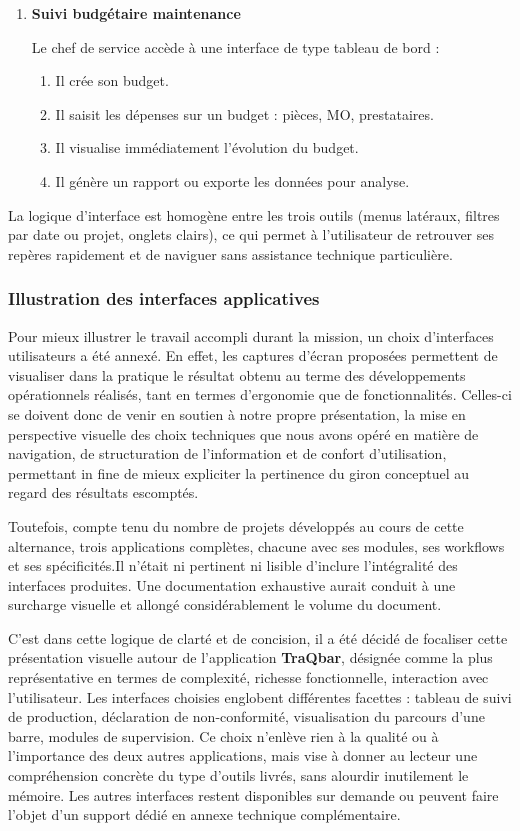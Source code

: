 \documentclass[11pt,a4paper]{article}
\begin{document}
\begin{enumerate}
\item \textbf{Suivi budgétaire maintenance} 

Le chef de service accède à une interface de type tableau de bord :
\begin{enumerate}
    \item Il crée son budget.
    \item Il saisit les dépenses sur un budget : pièces, MO, prestataires.
    \item Il visualise immédiatement l’évolution du budget.
    \item Il génère un rapport ou exporte les données pour analyse.
\end{enumerate}
\end{enumerate}
La logique d’interface est homogène entre les trois outils (menus latéraux, filtres par date ou projet, onglets clairs), ce qui permet à l’utilisateur de retrouver ses repères rapidement et de naviguer sans assistance technique particulière.

\subsubsection{Illustration des interfaces applicatives}

Pour mieux illustrer le travail accompli durant la mission, un choix d’interfaces utilisateurs a été annexé. En effet, les captures d’écran proposées permettent de visualiser dans la pratique le résultat obtenu au terme des développements opérationnels réalisés, tant en termes d’ergonomie que de fonctionnalités. Celles-ci se doivent donc de venir en soutien à notre propre présentation, la mise en perspective visuelle des choix techniques que nous avons opéré en matière de navigation, de structuration de l’information et de confort d’utilisation, permettant in fine de mieux expliciter la pertinence du giron conceptuel au regard des résultats escomptés.

Toutefois, compte tenu du nombre de projets développés au cours de cette alternance, trois applications complètes, chacune avec ses modules, ses workflows et ses spécificités.Il n’était ni pertinent ni lisible d’inclure l’intégralité des interfaces produites. Une documentation exhaustive aurait conduit à une surcharge visuelle et allongé considérablement le volume du document.

C’est dans cette logique de clarté et de concision, il a été décidé de focaliser cette présentation visuelle autour de l’application \textbf{TraQbar}, désignée comme la plus représentative en termes de complexité, richesse fonctionnelle, interaction avec l’utilisateur. Les interfaces choisies englobent différentes facettes : tableau de suivi de production, déclaration de non-conformité, visualisation du parcours d’une barre, modules de supervision. Ce choix n’enlève rien à la qualité ou à l’importance des deux autres applications, mais vise à donner au lecteur une compréhension concrète du type d’outils livrés, sans alourdir inutilement le mémoire. Les autres interfaces restent disponibles sur demande ou peuvent faire l’objet d’un support dédié en annexe technique complémentaire.
\end{document}
